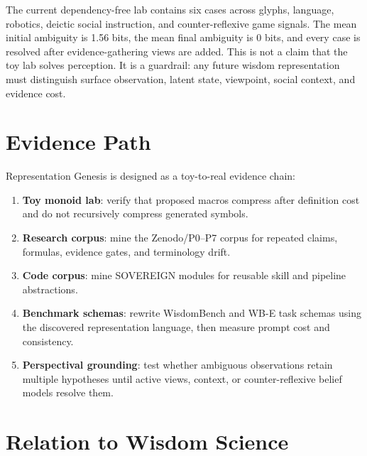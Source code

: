 \documentclass[11pt]{article}
\begin{document}
\begin{table}[t]
\centering
\small
\caption{Perspectival Grounding toy lab. Each case starts from a single ambiguous projection and chooses low-cost additional evidence until the latent hypothesis set is resolved. Generated from \texttt{perspectival\_grounding\_v0.json}.}
\label{tab:perspectival_grounding}

\end{table}

The current dependency-free lab contains six cases across glyphs, language, robotics, deictic social instruction, and counter-reflexive game signals.
The mean initial ambiguity is 1.56 bits, the mean final ambiguity is 0 bits, and every case is resolved after evidence-gathering views are added.
This is not a claim that the toy lab solves perception.
It is a guardrail: any future wisdom representation must distinguish surface observation, latent state, viewpoint, social context, and evidence cost.

\section{Evidence Path}

Representation Genesis is designed as a toy-to-real evidence chain:
\begin{enumerate}[leftmargin=*]
  \item \textbf{Toy monoid lab}: verify that proposed macros compress after definition cost and do not recursively compress generated symbols.
  \item \textbf{Research corpus}: mine the Zenodo/P0--P7 corpus for repeated claims, formulas, evidence gates, and terminology drift.
  \item \textbf{Code corpus}: mine SOVEREIGN modules for reusable skill and pipeline abstractions.
  \item \textbf{Benchmark schemas}: rewrite WisdomBench and WB-E task schemas using the discovered representation language, then measure prompt cost and consistency.
  \item \textbf{Perspectival grounding}: test whether ambiguous observations retain multiple hypotheses until active views, context, or counter-reflexive belief models resolve them.
\end{enumerate}

\section{Relation to Wisdom Science}
\end{document}
